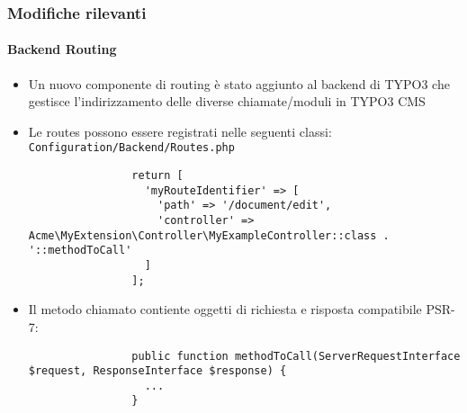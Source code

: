 \begin{frame}[fragile]
	\frametitle{Modifiche rilevanti}
	\framesubtitle{Backend Routing}

	\lstset{basicstyle=\tiny\ttfamily}

	\begin{itemize}

		\item Un nuovo componente di routing è stato aggiunto al backend di TYPO3 che gestisce 
			l'indirizzamento delle diverse chiamate/moduli in TYPO3 CMS

		\item Le routes possono essere registrati nelle seguenti classi:\newline
			\small
				\texttt{Configuration/Backend/Routes.php}
			\normalsize

			\begin{lstlisting}
				return [
				  'myRouteIdentifier' => [
				    'path' => '/document/edit',
				    'controller' => Acme\MyExtension\Controller\MyExampleController::class . '::methodToCall'
				  ]
				];
			\end{lstlisting}

		\item Il metodo chiamato contiente oggetti di richiesta e risposta compatibile PSR-7:

			\begin{lstlisting}
				public function methodToCall(ServerRequestInterface $request, ResponseInterface $response) {
				  ...
				}
			\end{lstlisting}

	\end{itemize}

\end{frame}



